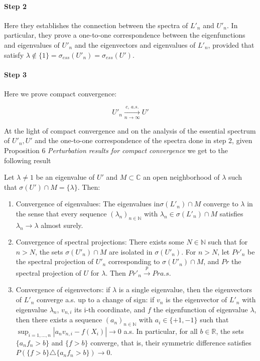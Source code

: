 \paragraph{Step 2} Here they establishes the connection between the spectra of $L'_n$ and $U'_n$. In particular, they prove a one-to-one correspondence between the eigenfunctions and eigenvalues of $U'_n$ and the eigenvectors and eigenvalues of $L'_n$, provided that satisfy $\lambda\notin \{1\}=\sigma_{ess}(U'_n)= \sigma_{ess}(U')$.
\paragraph{Step 3} Here we prove compact convergence:

$$U'_n \xrightarrow[n\to\infty]{c,\ a.s.}U'$$

At the light of compact convergence and on the analysis of the essential spectrum of $U'_n, U'$ and the one-to-one correspondence of the spectra done in step 2, given Proposition 6 \textit{Perturbation results for compact convergence} we get to the following result

\begin{theorem}
	Let $\lambda\neq 1 $ be an eigenvalue of $U'$ and $M\subset \mathbb C$ an open neighborhood of $\lambda$ such that $\sigma(U')\cap M=\{\lambda\}$. Then:
\begin{enumerate}
	\item Convergence of eigenvalues: The eigenvalues in$\sigma(L'_n)\cap M$ converge to $\lambda$ in the sense that every sequence $(\lambda_n)_{n\in\mathbb N}$ with $\lambda_n\in\sigma(L'_n)\cap M$ satisfies $\lambda_n\rightarrow \lambda$ almost surely.
	\item Convergence of spectral projections: There exists some $N\in\mathbb N$ such that for $n>N$, the sets $\sigma(U'_n)\cap M$ are isolated in $\sigma(U'_n)$. For $n>N$, let $Pr'_n$ be the spectral projection of $U'_n$ corresponding to $\sigma(U'_n)\cap M$, and $Pr$ the spectral projection of $U$ for $\lambda$. Then $Pr'_n\xrightarrow p Pr a.s.$
	\item Convergence of eigenvectors: if $\lambda$ is a single eigenvalue, then the eigenvectors of $L'_n$ converge a.s. up to a change of sign: if $v_n$ is the eigenvector
	of $L'_n$ with eigenvalue $\lambda_n$, $v_{n,i}$ its i-th coordinate, and $f$ the eigenfunction of eigenvalue $\lambda$, then there exists a sequence $(a_n)_{n\in\mathbb N}$ with $a_i \in \{+1,-1\}$ such that $\sup_{i=1,...,n} |a_nv_{n,i} - f(X_i)| \rightarrow 0$ a.s. In particular, for all $b \in\mathbb R$, the sets $\{a_nf_n > b\}$ and $\{f > b\}$ converge, that is, their symmetric difference satisfies $P(\{f > b\}\triangle\{a_nf_n > b\}) \rightarrow 0$.
\end{enumerate}
\end{theorem}

